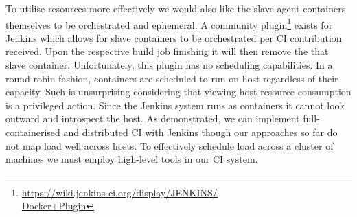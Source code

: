 \documentclass[journal]{IEEEtran}
\begin{document}
To utilise resources more effectively we would also like the slave-agent containers themselves to be orchestrated and ephemeral. 
A community plugin\footnote{\href{https://wiki.jenkins-ci.org/display/JENKINS/Docker+Plugin}{https://wiki.jenkins-ci.org/display/JENKINS/\\Docker+Plugin}} exists 
for Jenkins which allows for slave containers to be orchestrated per CI contribution received. Upon the respective 
build job finishing it will then remove the that slave container. 
Unfortunately, this plugin has no scheduling capabilities. In a round-robin fashion, containers are scheduled to run on host
regardless of their capacity. Such is unsurprising considering that viewing host resource consumption 
is a privileged action. Since the Jenkins system runs as containers it cannot look outward and introspect the host.
As demonstrated, we can implement full-containerised and distributed CI with Jenkins though our approaches so far do not map load well across hosts. To 
effectively schedule load across a cluster of machines we must employ high-level tools in our CI system.  
\end{document}
